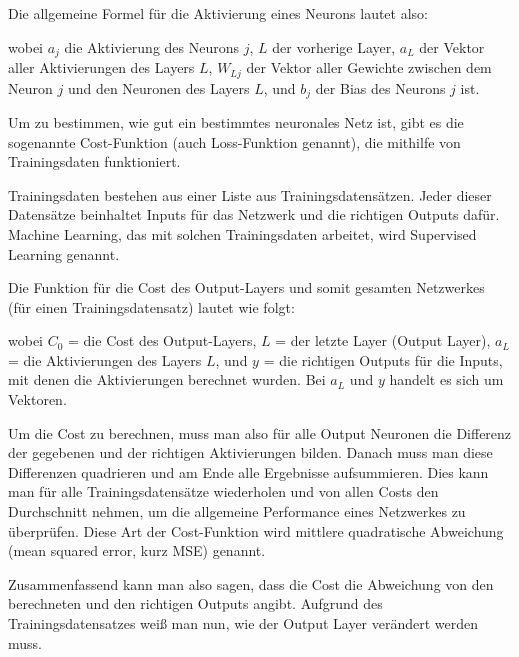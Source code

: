 \documentclass[11pt]{scrartcl}
\begin{document}
	Die allgemeine Formel für die Aktivierung eines Neurons lautet also:


	\form{
	\[
		\sig(x)=\frac{1}{1+e^{-x}}
		\]
	\[
		a_{j} = \sig\left(\sum_{L} (a_{L} * W_{Lj}) + b_{j}\right)
		\]}
	
	\noindent wobei $a_j$ die Aktivierung des Neurons $j$, $L$ der vorherige Layer, $a_L$ der Vektor aller Aktivierungen des Layers $L$, $W_{Lj}$ der Vektor aller Gewichte zwischen dem Neuron $j$ und den Neuronen des Layers $L$, und $b_j$ der Bias des Neurons $j$ ist. \cite{brotcrunsher:forwardpass}	
	

	Um zu bestimmen, wie gut ein bestimmtes neuronales Netz ist, gibt es die sogenannte Cost-Funktion (auch Loss-Funktion genannt), die mithilfe von Trainingsdaten funktioniert.
	
	Trainingsdaten bestehen aus einer Liste aus Trainingsdatensätzen. Jeder dieser Datensätze beinhaltet Inputs für das Netzwerk und die richtigen Outputs dafür. Machine Learning, das mit solchen Trainingsdaten arbeitet, wird Supervised Learning genannt.

	Die Funktion für die Cost des Output-Layers und somit gesamten Netzwerkes (für einen Trainingsdatensatz) lautet wie folgt:

	\form{ \[
		C_0 = (a_L - y)^2
	\]}


	\noindent wobei $C_0$ = die Cost des Output-Layers, $L$ = der letzte Layer (Output Layer), $a_L$ = die Aktivierungen des Layers $L$, und $y$ = die richtigen Outputs für die Inputs, mit denen die Aktivierungen berechnet wurden. 
	Bei $a_L$ und $y$ handelt es sich um Vektoren.
	
	Um die Cost zu berechnen, muss man also für alle Output Neuronen die Differenz der gegebenen und der richtigen Aktivierungen bilden. Danach muss man diese Differenzen quadrieren und am Ende alle Ergebnisse aufsummieren. Dies kann man für alle Trainingsdatensätze wiederholen und von allen Costs den Durchschnitt nehmen, um die allgemeine Performance eines Netzwerkes zu überprüfen. Diese Art der Cost-Funktion wird mittlere quadratische Abweichung (mean squared error, kurz MSE) genannt. 
	
	Zusammenfassend kann man also sagen, dass die Cost die Abweichung von den berechneten und den richtigen Outputs angibt. Aufgrund des Trainingsdatensatzes weiß man nun, wie der Output Layer verändert werden
	muss.

\end{document}
